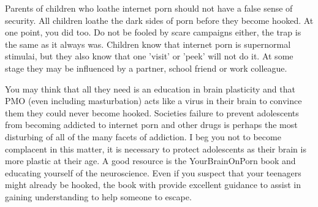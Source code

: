 \documentclass[easypeasy]{subfiles}
\begin{document}
Parents of children who loathe internet porn should not have a false sense of security. All children loathe the dark sides of porn before they become hooked. At one point, you did too. Do not be fooled by scare campaigns either, the trap is the same as it always was. Children know that internet porn is supernormal stimulai, but they also know that one 'visit' or 'peek' will not do it. At some stage they may be influenced by a partner, school friend or work colleague.

You may think that all they need is an education in brain plasticity and that PMO (even including masturbation) acts like a virus in their brain to convince them they could never become hooked. Societies failure to prevent adolescents from becoming addicted to internet porn and other drugs is perhaps the most disturbing of all of the many facets of addiction. I beg you not to become complacent in this matter, it is necessary to protect adolescents as their brain is more plastic at their age. A good resource is the YourBrainOnPorn book and educating yourself of the neuroscience. Even if you suspect that your teenagers might already be hooked, the book with provide excellent guidance to assist in gaining understanding to help someone to escape.
\end{document}
